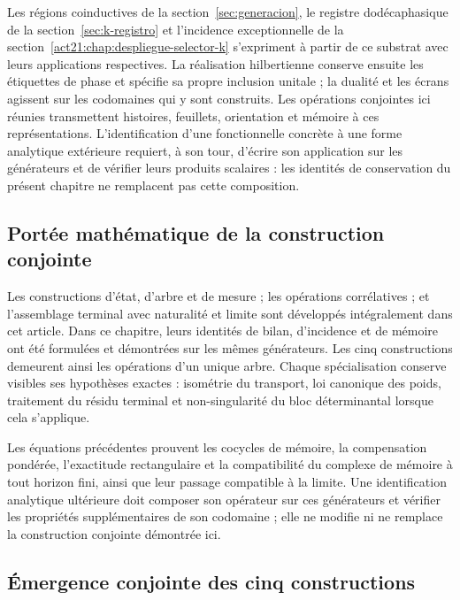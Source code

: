 Les régions coinductives de la section~\ref{sec:generacion}, le registre
dodécaphasique de la section~\ref{sec:k-registro} et l’incidence exceptionnelle
de la section~\ref{act21:chap:despliegue-selector-k} s’expriment à partir de ce substrat avec leurs applications
respectives. La réalisation hilbertienne conserve ensuite les étiquettes de
phase et spécifie sa propre inclusion unitale ; la dualité et les écrans
agissent sur les codomaines qui y sont construits. Les opérations conjointes ici
réunies transmettent histoires, feuillets, orientation et mémoire à ces
représentations. L’identification d’une fonctionnelle concrète à une forme
analytique extérieure requiert, à son tour, d’écrire son application sur les
générateurs et de vérifier leurs produits scalaires : les identités de
conservation du présent chapitre ne remplacent pas cette composition.


\subsection{Portée mathématique de la construction conjointe}
Les constructions d'état, d'arbre et de mesure ; les opérations corrélatives ; et
l'assemblage terminal avec naturalité et limite sont développés intégralement
dans cet article. Dans ce chapitre, leurs identités de
bilan, d'incidence et de mémoire ont été formulées et démontrées sur les mêmes
générateurs. Les cinq constructions demeurent ainsi les opérations d'un
unique arbre. Chaque spécialisation conserve visibles ses hypothèses exactes :
isométrie du transport, loi canonique des poids, traitement du résidu
terminal et non-singularité du bloc déterminantal lorsque cela s'applique.

Les équations précédentes prouvent les cocycles de mémoire, la compensation
pondérée, l'exactitude rectangulaire et la compatibilité du complexe de
mémoire à tout horizon fini, ainsi que leur passage compatible à la limite.
Une identification analytique ultérieure doit composer son opérateur sur ces
générateurs et vérifier les propriétés supplémentaires de son codomaine ; elle ne
modifie ni ne remplace la construction conjointe démontrée ici.

\iffalse
\subsection{Émergence conjointe des cinq constructions}
\label{act21:sec:cinco-construcciones-continuo-ch}

